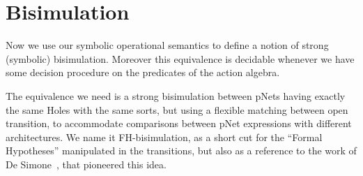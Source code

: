 \documentclass{lncs/llncs}
\newcommand{\TODO}[1]{\textcolor{red}{\textbf{[TODO:#1]}}}
\begin{document}
\section{Bisimulation}
\label{section:bisimulation}

	Now we use our symbolic operational semantics to define a notion of
	strong (symbolic) bisimulation. Moreover this equivalence is decidable whenever we 
	have some
	decision procedure on the predicates of the action algebra.



The equivalence we need is a strong bisimulation between
pNets having exactly the same Holes with the same sorts, but using a
flexible matching 
between open transition, to accommodate comparisons between pNet
expressions with different architectures.
 We name it FH-bisimulation,
 as a short cut for the ``Formal Hypotheses'' manipulated in the
 transitions, but also as a reference to the work of De Simone~\cite{deSimone85},
 that pioneered this idea.
\end{document}
